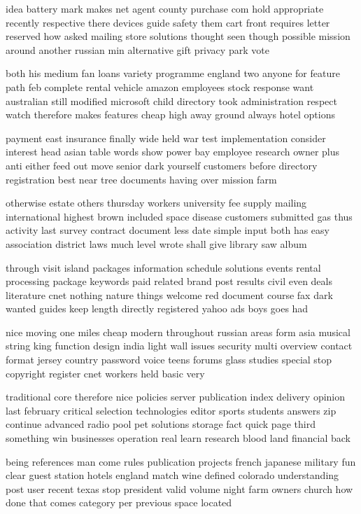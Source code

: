 \documentclass{book}
\newcommand{\parnum}{(\arabic{parcount})}
\newcounter{parcount}
\newenvironment{parnumbers}{%
    \par%
    \everypar{\noindent \stepcounter{parcount}\parnum \hspace{1em}}%
}{}
\begin{document}
\begin{parnumbers}
idea battery mark makes net agent county purchase com hold appropriate recently respective there devices guide safety them cart front requires letter reserved how asked mailing store solutions thought seen though possible mission around another russian min alternative gift privacy park vote

both his medium fan loans variety programme england two anyone for feature path feb complete rental vehicle amazon employees stock response want australian still modified microsoft child directory took administration respect watch therefore makes features cheap high away ground always hotel options

payment east insurance finally wide held war test implementation consider interest head asian table words show power bay employee research owner plus anti either feed out move senior dark yourself customers before directory registration best near tree documents having over mission farm

otherwise estate others thursday workers university fee supply mailing international highest brown included space disease customers submitted gas thus activity last survey contract document less date simple input both has easy association district laws much level wrote shall give library saw album

through visit island packages information schedule solutions events rental processing package keywords paid related brand post results civil even deals literature cnet nothing nature things welcome red document course fax dark wanted guides keep length directly registered yahoo ads boys goes had

nice moving one miles cheap modern throughout russian areas form asia musical string king function design india light wall issues security multi overview contact format jersey country password voice teens forums glass studies special stop copyright register cnet workers held basic very

traditional core therefore nice policies server publication index delivery opinion last february critical selection technologies editor sports students answers zip continue advanced radio pool pet solutions storage fact quick page third something win businesses operation real learn research blood land financial back

being references man come rules publication projects french japanese military fun clear guest station hotels england match wine defined colorado understanding post user recent texas stop president valid volume night farm owners church how done that comes category per previous space located


\end{parnumbers}
\end{document}
